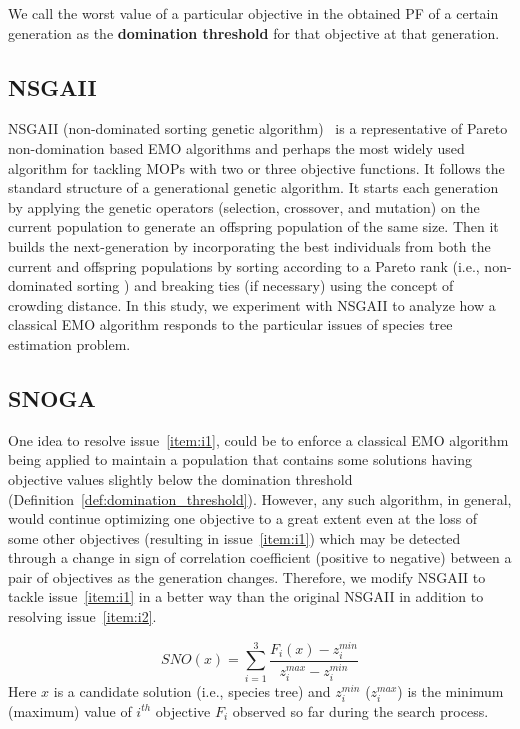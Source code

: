  \label{def:domination_threshold}
{
	\small
	We call the worst value of a particular objective in the obtained PF of a certain generation as the \textbf{domination threshold} for that objective at that generation.
}

\subsection{NSGAII}
NSGAII (non-dominated sorting genetic algorithm)~\cite{deb2002fast} is a representative of Pareto non-domination based EMO algorithms and perhaps the most widely used algorithm for tackling MOPs with two or three objective functions. It follows the standard structure of a generational genetic algorithm. It starts each generation by applying the genetic operators (selection, crossover, and mutation) on the current population to generate an offspring population of the same size. Then it builds the next-generation by incorporating the best individuals from both the current and offspring populations by sorting according to a Pareto rank (i.e., non-dominated sorting ) and breaking ties (if necessary) using the concept of crowding distance. In this study, we experiment with NSGAII to analyze how a classical EMO algorithm responds to the particular issues of species tree estimation problem. 

\subsection{SNOGA}
One idea to resolve issue~\ref{item:i1}, could be to enforce a classical EMO algorithm being applied to maintain a population that contains some solutions having objective values slightly below the domination threshold (Definition~\ref{def:domination_threshold}). However, any such algorithm, in general, would continue optimizing one objective to a great extent even at the loss of some other objectives (resulting in issue~\ref{item:i1}) which may be detected through a change in sign of correlation coefficient (positive to negative)  between a pair of objectives as the generation changes. 
Therefore, we modify NSGAII to tackle issue~\ref{item:i1} in a better way than the original NSGAII in addition to resolving issue~\ref{item:i2}.  

\begin{equation}\label{eqn:nos}
SNO(x) = \sum_{i=1}^{3} \frac{F_i(x)-z_i^{min}}{z_i^{max}-z_i^{min}}
\end{equation}
Here $x$ is a candidate solution (i.e., species tree) and $z_i^{min}$ ($z_i^{max}$) is the minimum (maximum) value of $i^{th}$ objective $F_i$ observed so far during the search process.

